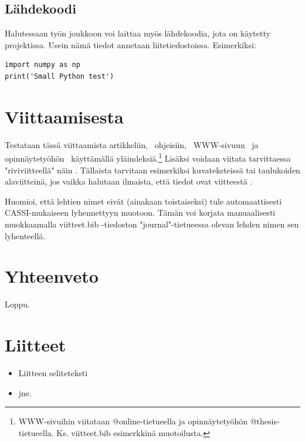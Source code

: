 \documentclass[a4paper, 12pt, finnish]{article}
\begin{document}
\subsection{Lähdekoodi}

Halutessaan työn joukkoon voi laittaa myös lähdekoodia, jota on käytetty projektissa. Usein nämä tiedot annetaan liitetiedostoissa. Esimerkiksi:
\begin{verbatim}
import numpy as np
print('Small Python test')
\end{verbatim}


\section{Viittaamisesta}

Testataan tässä viittaamista artikkeliin,~\cite{PhysRev.136.B864, 10.1063/5.0182685} ohjeisiin,~\cite{ohje} WWW-sivuun~\cite{iupac} ja opinnäytetyöhön~\cite{thesis} käyttämällä yläindeksiä.\footnote{WWW-sivuihin viitataan @online-tietueella ja opinnäytetyöhön @thesis-tietueella. Ks. viitteet.bib esimerkkinä muotoilusta.} Lisäksi voidaan viitata tarvittaessa "riviviitteellä" näin . Tällaista tarvitaan esimerkiksi kuvateksteissä tai taulukoiden alaviitteinä, jos vaikka halutaan ilmaista, että tiedot ovat viitteestä . 


Huomioi, että lehtien nimet eivät (ainakaan toistaiseksi) tule automaattisesti CASSI-mukaiseen lyhennettyyn muotoon. Tämän voi korjata manuaalisesti muokkaamalla viitteet.bib -tiedoston "journal"-tietueessa olevan lehden nimen sen lyhenteellä.


\section{Yhteenveto}

Loppu.

\newpage
{}
\printbibliography[title=Viitteet]

\newpage
\section*{Liitteet}

\begin{itemize}
\itemindent=5mm
    \item[Liite 1:] Liitteen seliteteksti 
    \item[Liite 2:] jne.
\end{itemize}

\end{document}
